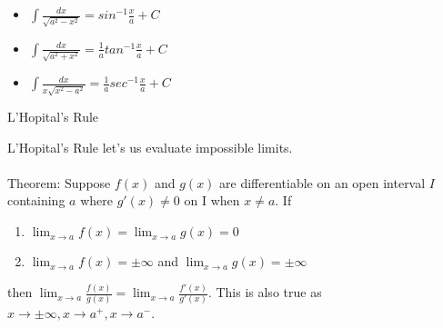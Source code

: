 \documentclass{article}
\begin{document}
\begin{itemize}
  \item {
  $\int\frac{dx}{\sqrt{a^2 - x^2}} = sin^{-1}\frac{x}{a}+C$
  }
  \item {
  $\int\frac{dx}{\sqrt{a^2 + x^2}} = \frac{1}{a}tan^{-1}\frac{x}{a}+C$
  }
  \item {
  $\int\frac{dx}{x\sqrt{x^2 - a^2}} = \frac{1}{a}sec^{-1}\frac{x}{a}+C$
  }
\end{itemize}

\noindent
\Large L'Hopital's Rule\\
\normalsize
\noindent

L'Hopital's Rule let's us evaluate impossible limits.\\\\

\noindent
Theorem: Suppose $f(x)$ and $g(x)$ are differentiable on an open interval $I$ containing $a$ where $g'(x) \neq 0$ on I when $x \neq a$. If
\begin{enumerate}
  \item $\lim_{x \to a}f(x) = \lim_{x \to a}g(x) = 0$
  \item $\lim_{x \to a}f(x) = \pm\infty$ and $\lim_{x \to a}g(x) = \pm\infty$
\end{enumerate}
then $\lim_{x \to a}\frac{f(x)}{g(x)} = \lim_{x \to a}\frac{f'(x)}{g'(x)}$. This is also true as $x \to \pm\infty, x \to a^+, x \to a^-$.
\end{document}
